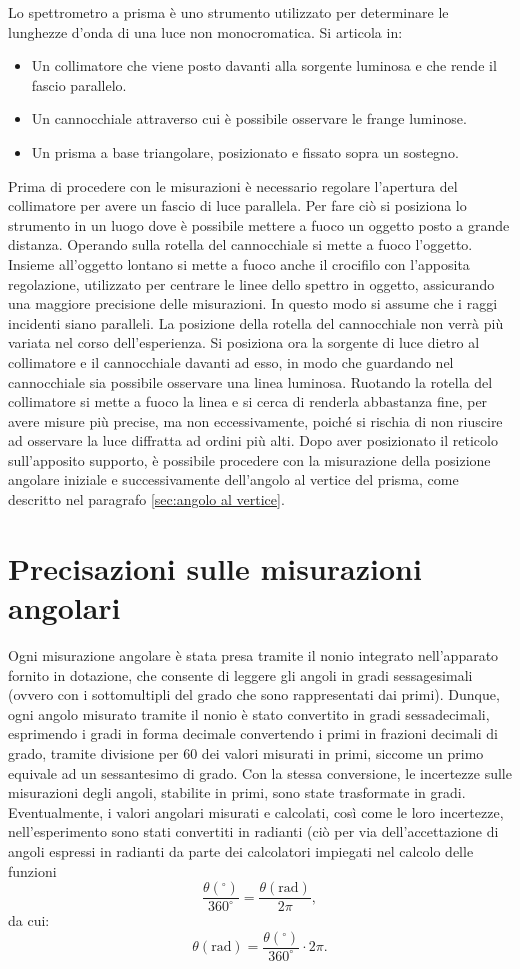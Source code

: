 \documentclass[a4paper,12pt]{article}
\begin{document}
Lo spettrometro a prisma è uno strumento utilizzato per determinare le lunghezze d’onda di una luce non monocromatica. Si articola in: 
\begin{itemize}
    \item Un collimatore che viene posto davanti alla sorgente luminosa e che rende il fascio parallelo. 
    \item Un cannocchiale attraverso cui è possibile osservare le frange luminose. 
    \item Un prisma a base triangolare, posizionato e fissato sopra un sostegno. 
\end{itemize}
Prima di procedere con le misurazioni è necessario regolare l’apertura del collimatore per avere un fascio di luce parallela. Per fare ciò si posiziona lo strumento in un luogo dove è possibile mettere a fuoco un oggetto posto a grande distanza. Operando sulla rotella del cannocchiale si mette a fuoco l’oggetto. Insieme all'oggetto lontano si mette a fuoco anche il crocifilo con l'apposita regolazione, utilizzato per centrare le linee dello spettro in oggetto, assicurando una maggiore precisione delle misurazioni. In questo modo si assume che i raggi incidenti siano paralleli. La posizione della rotella del cannocchiale non verrà più variata nel corso dell’esperienza.  
Si posiziona ora la sorgente di luce dietro al collimatore e il cannocchiale davanti ad esso, in modo che guardando nel cannocchiale sia possibile osservare una linea luminosa. Ruotando la rotella del collimatore si mette a fuoco la linea e si cerca di renderla abbastanza fine, per avere misure più precise, ma non eccessivamente, poiché si rischia di non riuscire ad osservare la luce diffratta ad ordini più alti.  
Dopo aver posizionato il reticolo sull’apposito supporto, è possibile procedere con la misurazione della posizione angolare iniziale e successivamente dell'angolo al vertice del prisma, come descritto nel paragrafo \ref{sec:angolo al vertice}.

\section{Precisazioni sulle misurazioni angolari}
Ogni misurazione angolare è stata presa tramite il nonio integrato nell’apparato fornito in dotazione, che consente di leggere gli angoli in gradi sessagesimali (ovvero con i sottomultipli del grado che sono rappresentati dai primi). Dunque, ogni angolo misurato tramite il nonio è stato convertito in gradi sessadecimali, esprimendo i gradi in forma decimale convertendo i primi in frazioni decimali di grado, tramite divisione per 60 dei valori misurati in primi, siccome un primo equivale ad un sessantesimo di grado. Con la stessa conversione, le incertezze sulle misurazioni degli angoli, stabilite in primi, sono state trasformate in gradi. Eventualmente, i valori angolari misurati e calcolati, così come le loro incertezze, nell’esperimento sono stati convertiti in radianti (ciò per via dell’accettazione di angoli espressi in radianti da parte dei calcolatori impiegati nel calcolo delle funzioni
\[
\frac{\theta (^\circ)}{360^\circ} = \frac{\theta (\text{rad})}{2\pi},
\]
da cui:
\[
\theta (\text{rad}) = \frac{\theta (^\circ)}{360^\circ} \cdot 2\pi.
\]
\end{document}
